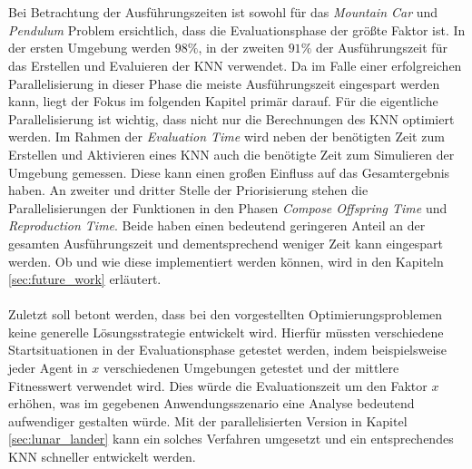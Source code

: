 \\\\
Bei Betrachtung der Ausführungszeiten ist sowohl für das \emph{Mountain Car} und \emph{Pendulum} Problem ersichtlich, dass die Evaluationsphase der größte Faktor ist. In der ersten Umgebung werden $98\%$, in der zweiten $91\%$ der Ausführungszeit für das Erstellen und Evaluieren der \ac{KNN} verwendet. Da im Falle einer erfolgreichen Parallelisierung in dieser Phase die meiste Ausführungszeit eingespart werden kann, liegt der Fokus im folgenden Kapitel primär darauf. Für die eigentliche Parallelisierung ist wichtig, dass nicht nur die Berechnungen des \ac{KNN} optimiert werden. Im Rahmen der \emph{Evaluation Time} wird neben der benötigten Zeit zum Erstellen und Aktivieren eines \ac{KNN} auch die benötigte Zeit zum Simulieren der Umgebung gemessen. Diese kann einen großen Einfluss auf das Gesamtergebnis haben. An zweiter und dritter Stelle der Priorisierung stehen die Parallelisierungen der Funktionen in den Phasen \emph{Compose Offspring Time} und \emph{Reproduction Time}. Beide haben einen bedeutend geringeren Anteil an der gesamten Ausführungszeit und dementsprechend weniger Zeit kann eingespart werden. Ob und wie diese implementiert werden können, wird in den Kapiteln \ref{sec:future_work} erläutert.
\\\\
Zuletzt soll betont werden, dass bei den vorgestellten Optimierungsproblemen keine generelle Lösungsstrategie entwickelt wird. Hierfür müssten verschiedene Startsituationen in der Evaluationsphase getestet werden, indem beispielsweise jeder Agent in $x$ verschiedenen Umgebungen getestet und der mittlere Fitnesswert verwendet wird. Dies würde die Evaluationszeit um den Faktor $x$ erhöhen, was im gegebenen Anwendungsszenario eine Analyse bedeutend aufwendiger gestalten würde. Mit der parallelisierten Version in Kapitel \ref{sec:lunar_lander} kann ein solches Verfahren umgesetzt und ein entsprechendes \ac{KNN} schneller entwickelt werden.

